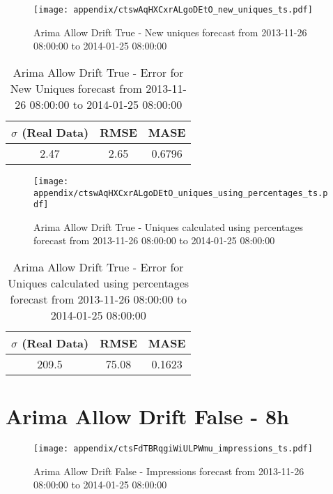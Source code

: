 \begin{figure}[H] \begin{center} \leavevmode
\texttt{[image: appendix/ctswAqHXCxrALgoDEtO\_new\_uniques\_ts.pdf]} \caption[]{
Arima Allow Drift True - New uniques forecast from 2013-11-26 08:00:00 to 2014-01-25 08:00:00} \label{fig:appendix/ctswAqHXCxrALgoDEtO_new_uniques_ts.pdf} \end{center}
\end{figure}

\begin{table}[H]
\centering
\footnotesize
\begin{tabular}{ccc}
$\sigma$ (Real Data) & RMSE & MASE   \\ \hline
2.47 & 2.65 & 0.6796 \\
\end{tabular}

\vspace{0.5cm}

\caption[]{
Arima Allow Drift True - Error for New Uniques forecast from 2013-11-26 08:00:00 to 2014-01-25 08:00:00}
\end{table}

\begin{figure}[H] \begin{center} \leavevmode
\texttt{[image: appendix/ctswAqHXCxrALgoDEtO\_uniques\_using\_percentages\_ts.pdf]} \caption[]{
Arima Allow Drift True - Uniques calculated using percentages forecast from 2013-11-26 08:00:00 to 2014-01-25 08:00:00} \label{fig:appendix/ctswAqHXCxrALgoDEtO_uniques_using_percentages_ts.pdf} \end{center}
\end{figure}

\begin{table}[H]
\centering
\footnotesize
\begin{tabular}{ccc}
$\sigma$ (Real Data) & RMSE & MASE   \\ \hline
209.5 & 75.08 & 0.1623 \\
\end{tabular}

\vspace{0.5cm}

\caption[]{
Arima Allow Drift True - Error for Uniques calculated using percentages forecast from 2013-11-26 08:00:00 to 2014-01-25 08:00:00}
\end{table}

\section{Arima Allow Drift False - 8h}
\begin{figure}[H] \begin{center} \leavevmode
\texttt{[image: appendix/ctsFdTBRqgiWiULPWmu\_impressions\_ts.pdf]} \caption[]{
Arima Allow Drift False - Impressions forecast from 2013-11-26 08:00:00 to 2014-01-25 08:00:00} \label{fig:appendix/ctsFdTBRqgiWiULPWmu_impressions_ts.pdf} \end{center}
\end{figure}

